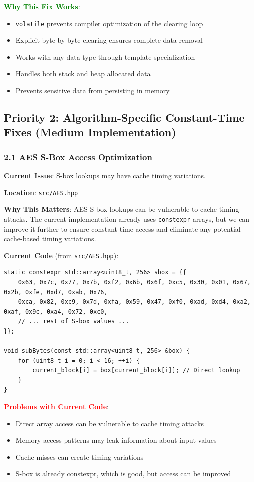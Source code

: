 \documentclass[11pt,a4paper]{article}
\begin{document}
\textcolor{green}{\textbf{Why This Fix Works}}:
\begin{itemize}
    \item \texttt{volatile} prevents compiler optimization of the clearing loop
    \item Explicit byte-by-byte clearing ensures complete data removal
    \item Works with any data type through template specialization
    \item Handles both stack and heap allocated data
    \item Prevents sensitive data from persisting in memory
\end{itemize}

\subsection{Priority 2: Algorithm-Specific Constant-Time Fixes (Medium Implementation)}

\subsubsection{2.1 AES S-Box Access Optimization}

\textbf{Current Issue}: S-box lookups may have cache timing variations.

\textbf{Location}: \texttt{src/AES.hpp}

\textbf{Why This Matters}: AES S-box lookups can be vulnerable to cache timing attacks. The current implementation already uses \texttt{constexpr} arrays, but we can improve it further to ensure constant-time access and eliminate any potential cache-based timing variations.

\textbf{Current Code} (from \texttt{src/AES.hpp}):
\begin{lstlisting}
static constexpr std::array<uint8_t, 256> sbox = {{
    0x63, 0x7c, 0x77, 0x7b, 0xf2, 0x6b, 0x6f, 0xc5, 0x30, 0x01, 0x67, 0x2b, 0xfe, 0xd7, 0xab, 0x76,
    0xca, 0x82, 0xc9, 0x7d, 0xfa, 0x59, 0x47, 0xf0, 0xad, 0xd4, 0xa2, 0xaf, 0x9c, 0xa4, 0x72, 0xc0,
    // ... rest of S-box values ...
}};

void subBytes(const std::array<uint8_t, 256> &box) {
    for (uint8_t i = 0; i < 16; ++i) {
        current_block[i] = box[current_block[i]]; // Direct lookup
    }
}
\end{lstlisting}

\textcolor{red}{\textbf{Problems with Current Code}}:
\begin{itemize}
    \item Direct array access can be vulnerable to cache timing attacks
    \item Memory access patterns may leak information about input values
    \item Cache misses can create timing variations
    \item S-box is already constexpr, which is good, but access can be improved
\end{itemize}
\end{document}
